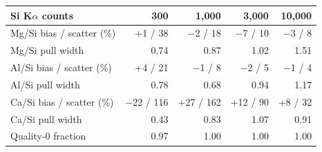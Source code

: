 \begin{tabular}{lrrrr}
\toprule
Si K$\alpha$ counts & 300 & 1,000 & 3,000 & 10,000\\
\midrule
Mg/Si bias / scatter (\%) & +1 / 38 & $-$2 / 18 & $-$7 / 10 & $-$3 / 8\\
Mg/Si pull width & 0.74 & 0.87 & 1.02 & 1.51\\
Al/Si bias / scatter (\%) & +4 / 21 & $-$1 / 8 & $-$2 / 5 & $-$1 / 4\\
Al/Si pull width & 0.78 & 0.68 & 0.94 & 1.17\\
Ca/Si bias / scatter (\%) & $-$22 / 116 & +27 / 162 & +12 / 90 & +8 / 32\\
Ca/Si pull width & 0.43 & 0.83 & 1.07 & 0.91\\
Quality-0 fraction & 0.97 & 1.00 & 1.00 & 1.00\\
\bottomrule
\end{tabular}
